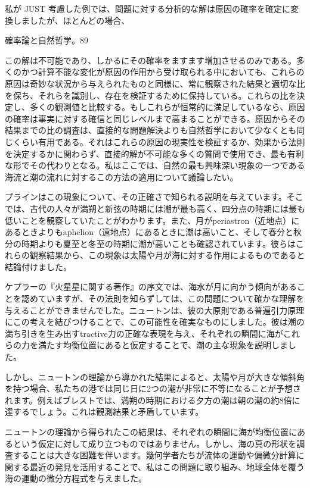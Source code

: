 \documentclass[a4paper,11pt,openany]{ltjsbook}
\begin{document}
私が JUST 考慮した例では、問題に対する分析的な解は原因の確率を確定に変換しましたが、ほとんどの場合、

確率論と自然哲学。89

この解は不可能であり、しかるにその確率をますます増加させるのみである。多くのかつ計算不能な変化が原因の作用から受け取られる中においても、これらの原因は奇妙な状況から与えられたものと同様に、常に観察された結果と適切な比を保ち、それらを識別し、存在を検証するために保持している。これらの比を決定し、多くの観測値と比較する。もしこれらが恒常的に満足しているなら、原因の確率は事実に対する確信と同じレベルまで高まることができる。原因からその結果までの比の調査は、直接的な問題解決よりも自然哲学において少なくとも同じくらい有用である。それはこれらの原因の現実性を検証するか、効果から法則を決定するかに関わらず、直接的解が不可能な多くの質問で使用でき、最も有利な形でその代わりとなる。私はここでは、自然の最も興味深い現象の一つである海流と潮の流れに対するこの方法の適用について議論したい。

プラインはこの現象について、その正確さで知られる説明を与えています。そこでは、古代の人々が満朔と新弦の時期には潮が最も高く、四分点の時期には最も低いことを観察していたことがわかります。また、月がperiastron（近地点）にあるときよりもaphelion（遠地点）にあるときに潮は高いこと、そして春分と秋分の時期よりも夏至と冬至の時期に潮が高いことも確認されています。彼らはこれらの観察結果から、この現象は太陽や月が海に対する作用によるものであると結論付けました。

ケプラーの『火星星に関する著作』の序文では、海水が月に向かう傾向があることを認めていますが、その法則を知らずしては、この問題について確かな理解を与えることができませんでした。ニュートンは、彼の大原則である普遍引力原理にこの考えを結びつけることで、この可能性を確実なものにしました。彼は潮の満ち引きを生み出すtractive力の正確な表現を与え、それぞれの瞬間に海がこれらの力を満たす均衡位置にあると仮定することで、潮の主な現象を説明しました。

しかし、ニュートンの理論から導かれた結果によると、太陽や月が大きな傾斜角を持つ場合、私たちの港では同じ日に2つの潮が非常に不等になることが予想されます。例えばブレストでは、満朔の時期における夕方の潮は朝の潮の約8倍に達するでしょう。これは観測結果と矛盾しています。

ニュートンの理論から得られたこの結果は、それぞれの瞬間に海が均衡位置にあるという仮定に対して成り立つものではありません。しかし、海の真の形状を調査することは大きな困難を伴います。幾何学者たちが流体の運動や偏微分計算に関する最近の発見を活用することで、私はこの問題に取り組み、地球全体を覆う海の運動の微分方程式を与えました。
\end{document}
